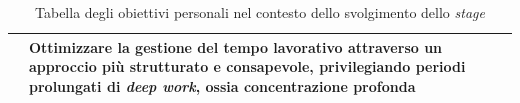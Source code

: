 \begin{table}[H]
\begin{tabular}{|>{\bfseries}c|m{15cm}|}
          \hline
          \multirow{2}{*}{\vspace*{\fill}P8\vspace*{\fill}} & Ottimizzare la gestione del tempo lavorativo attraverso un approccio più strutturato e consapevole, privilegiando periodi prolungati di \textit{deep work}, ossia concentrazione profonda\\ 
          \hline
        \end{tabular}
        \caption[Tabella degli obiettivi personali]{Tabella degli obiettivi personali nel contesto dello svolgimento dello \textit{stage}}
        \label{tab:obiettivi-personali}
        \end{table}